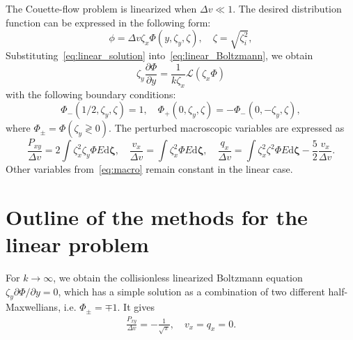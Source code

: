 \documentclass[review]{elsarticle}
\newcommand{\dd}{\mathrm{d}}
\newcommand{\pder}[2][]{\frac{\partial#1}{\partial#2}}
\newcommand{\Pder}[2][]{\partial#1/\partial#2}
\newcommand{\dzeta}{\boldsymbol{\dd\zeta}}
\begin{document}
The Couette-flow problem is linearized when \(\Delta{v}\ll 1\).
The desired distribution function can be expressed in the following form:
\begin{equation}\label{eq:linear_solution}
    \phi = \Delta{v} \zeta_x \Phi(y,\zeta_y,\zeta), \quad \zeta = \sqrt{\zeta_i^2},
\end{equation}
Substituting~\eqref{eq:linear_solution} into~\eqref{eq:linear_Boltzmann}, we obtain
\begin{equation}\label{eq:linear_equation}
    \zeta_y \pder[\Phi]{y} = \frac1{k\zeta_x}\mathcal{L}(\zeta_x\Phi)
\end{equation}
with the following boundary conditions:
\begin{equation}\label{eq:linear_bc}
    \Phi_-(1/2,\zeta_y,\zeta) = 1, \quad \Phi_+(0,\zeta_y,\zeta) = -\Phi_-(0,-\zeta_y,\zeta),
\end{equation}
where \(\Phi_\pm = \Phi(\zeta_y \gtrless 0)\).
The perturbed macroscopic variables are expressed as
\begin{equation}\label{eq:linear_macro}
    \frac{P_{xy}}{\Delta{v}} = 2\int \zeta_x^2 \zeta_y \Phi E\dzeta, \quad
    \frac{v_x}{\Delta{v}} = \int \zeta_x^2 \Phi E\dzeta, \quad
    \frac{q_x}{\Delta{v}} = \int \zeta_x^2 \zeta^2 \Phi E\dzeta - \frac52 \frac{v_x}{\Delta{v}}.
\end{equation}
Other variables from~\eqref{eq:macro} remain constant in the linear case.

\section{Outline of the methods for the linear problem}

For \(k\to\infty\), we obtain the collisionless linearized Boltzmann equation \(\zeta_y\Pder[\Phi]{y} = 0\),
which has a simple solution as a combination of two different half-Maxwellians, i.e. \(\Phi_\pm = \mp 1\).
It gives
\begin{gather}\label{eq:linear_free_macro}
    \frac{P_{xy}}{\Delta{v}} = -\frac1{\sqrt{\pi}}, \quad v_x = q_x = 0.
\end{gather}
\end{document}
